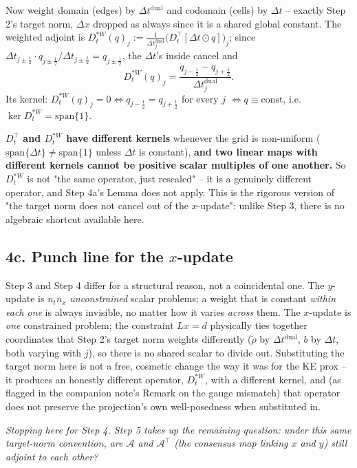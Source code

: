 \documentclass[11pt]{article}
\newcommand{\dt}{\Delta t}
\newcommand{\dx}{\Delta x}
\newcommand{\half}{\tfrac12}
\begin{document}
Now weight domain (edges) by $\dt^\mathrm{dual}$ and codomain (cells) by $\dt$ -- exactly Step 2's
target norm, $\dx$ dropped as always since it is a shared global constant. The weighted adjoint is
$D_t^{*W}(q)_j := \frac{1}{\dt_j^\mathrm{dual}}\bigl(D_t^\top[\dt\odot q]\bigr)_j$; since
$\dt_{j\pm\half}\cdot q_{j\pm\half}/\dt_{j\pm\half}=q_{j\pm\half}$, the $\dt$'s inside cancel and
\[
  D_t^{*W}(q)_j = \frac{q_{j-\half}-q_{j+\half}}{\dt_j^\mathrm{dual}}.
\]
Its kernel: $D_t^{*W}(q)_j=0 \Leftrightarrow q_{j-\half}=q_{j+\half}$ for every $j$
$\Leftrightarrow q\equiv\mathrm{const}$, i.e.\ $\ker D_t^{*W}=\mathrm{span}\{1\}$.

\textbf{$D_t^\top$ and $D_t^{*W}$ have different kernels} whenever the grid is non-uniform
($\mathrm{span}\{\dt\}\neq\mathrm{span}\{1\}$ unless $\dt$ is constant), \textbf{and two linear
maps with different kernels cannot be positive scalar multiples of one another.} So $D_t^{*W}$ is
not "the same operator, just rescaled" -- it is a genuinely different operator, and Step 4a's
Lemma does not apply. This is the rigorous version of "the target norm does not cancel out of the $x$-update":
unlike Step 3, there is no algebraic shortcut available here.

\subsection*{4c. Punch line for the $x$-update}

Step 3 and Step 4 differ for a structural reason, not a coincidental one. The $y$-update is
$n_tn_x$ \emph{unconstrained} scalar problems; a weight that is constant \emph{within each one} is
always invisible, no matter how it varies \emph{across} them. The $x$-update is \emph{one}
constrained problem; the constraint $Lx=d$ physically ties together coordinates that Step 2's
target norm weights differently ($\tilde\rho$ by $\dt^\mathrm{dual}$, $b$ by $\dt$, both varying
with $j$), so there is no shared scalar to divide out. Substituting the target norm here is not a
free, cosmetic change the way it was for the KE prox -- it produces an honestly different operator,
$D_t^{*W}$, with a different kernel, and (as flagged in the companion note's Remark on the gauge
mismatch) that operator does not preserve the projection's own well-posedness when substituted in.

\bigskip
\noindent\emph{Stopping here for Step 4. Step 5 takes up the remaining question: under this same
target-norm convention, are $\mathcal{A}$ and $\mathcal{A}^\top$ (the consensus map linking $x$ and
$y$) still adjoint to each other?}
\end{document}
